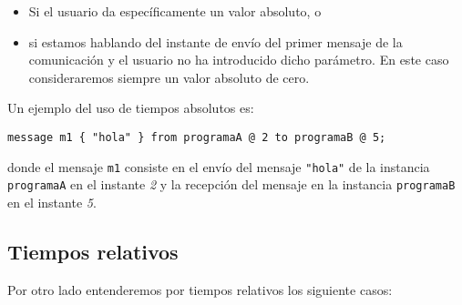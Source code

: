 \begin{itemize}
\item Si el usuario da específicamente un valor absoluto, o
\item si estamos hablando del instante de envío del primer mensaje de
  la comunicación y el usuario no ha introducido dicho parámetro. En
  este caso consideraremos siempre un valor absoluto de cero.
\end{itemize}

Un ejemplo del uso de tiempos absolutos es:

\begin{lstlisting}
message m1 { "hola" } from programaA @ 2 to programaB @ 5;
\end{lstlisting}

donde el mensaje \lstinline{m1} consiste en el envío del mensaje
\lstinline{"hola"} de la instancia \lstinline{programaA} en el
instante \textit{2} y la recepción del mensaje en la instancia
\lstinline{programaB} en el instante \textit{5}.

\subsection{Tiempos relativos}

Por otro lado entenderemos por tiempos relativos los siguiente casos:

